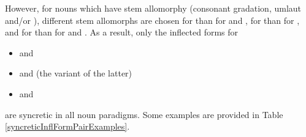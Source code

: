 However, for nouns which have stem allomorphy (consonant gradation, umlaut and/or \jvh), different stem allomorphs are chosen for  than for  and , for  than for , and for  than for  and .
As a result, only the inflected forms for
\begin{itemize}
\item{ and }
\item{ and  (the  variant of the latter)}
\item{ and }
\end{itemize}
are syncretic in all noun paradigms. Some examples are provided in Table \vref{syncreticInflFormPairExamples}.

